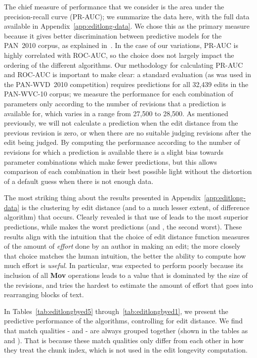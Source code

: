 The chief measure of performance that we consider is
the area under the precision-recall curve (PR-AUC);
we summarize the data here, with
the full data available in Appendix~\ref{app:editlong-data}.
We chose this as the primary measure because it gives better
discrimination between predictive models for the PAN~2010
corpus, as explained in~\cite{Potthast2010b}.
In the case of our variations, PR-AUC is highly correlated
with ROC-AUC, so the choice does not largely impact the ordering
of the different algorithms.
Our methodology for calculating PR-AUC and ROC-AUC is important
to make clear: a standard evaluation (as was used in the
PAN-WVD~2010 competition) requires predictions for all 32,439
edits in the PAN-WVC-10 corpus; we measure the performance
for each combination of parameters only according to the number
of revisions that a prediction is available for, which varies
in a range from 27,500 to 28,500.
As mentioned previously, we will not calculate a prediction
when the edit distance from the previous revision is zero,
or when there are no suitable judging revisions after the
edit being judged.
By computing the performance according to the number of revisions
for which a prediction is available there is a slight bias towards
parameter combinations which make fewer predictions,
but this allows comparison of each combination in their best
possible light without the distortion of a default guess when
there is not enough data.

The most striking thing about the results presented
in Appendix~\ref{app:editlong-data} is the clustering
by edit distance (and to a much lesser extent, of difference
algorithm) that occurs.
Clearly revealed is that use of  leads to the most superior
predictions, while  makes the worst predictions
(and , the second worst).
These results align with the intuition that the choice
of edit distance function measures of the amount
of \textit{effort} done by an author in making an edit;
the more closely that choice matches the human intuition,
the better the ability to compute how much effort is \textit{useful}.
In particular,  was expected to perform poorly
because its inclusion of all \textbf{Mov} operations leads
to a value that is dominated by the size of the revisions,
and  tries the hardest to estimate the amount of
effort that goes into rearranging blocks of text.

In Tables~\ref{tab:editlongbyed5} through~\ref{tab:editlongbyed1},
we present the predictive performance of the algorithms,
controlling for edit distance.
We find that match qualities - and - are always grouped
together (shown in the tables as  and ).
That is because these match qualities only differ from each
other in how they treat the chunk index, which is not used in the
edit longevity computation.

